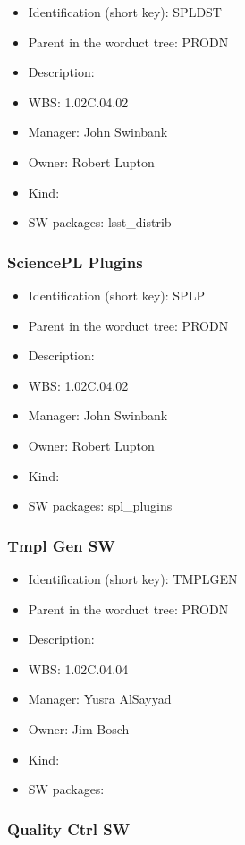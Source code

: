 \begin{itemize}\item Identification (short key): SPLDST
\item Parent in the worduct tree: PRODN
\item Description: 
\item WBS: 1.02C.04.02
\item Manager: John Swinbank
\item Owner: Robert Lupton
\item Kind:
\item SW packages: lsst\_distrib
\end{itemize}\subsubsection{SciencePL Plugins}
\begin{itemize}\item Identification (short key): SPLP
\item Parent in the worduct tree: PRODN
\item Description: 
\item WBS: 1.02C.04.02
\item Manager: John Swinbank
\item Owner: Robert Lupton
\item Kind:
\item SW packages: spl\_plugins
\end{itemize}\subsubsection{Tmpl Gen SW}
\begin{itemize}\item Identification (short key): TMPLGEN
\item Parent in the worduct tree: PRODN
\item Description: 
\item WBS: 1.02C.04.04
\item Manager: Yusra AlSayyad
\item Owner: Jim Bosch
\item Kind:
\item SW packages: 
\end{itemize}\subsubsection{Quality Ctrl SW}
